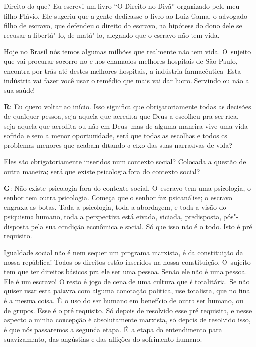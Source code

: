  

Direito do que? Eu escrevi um livro ``O Direito no Divã'' organizado
pelo meu filho Flávio. Ele sugeriu que a gente dedicasse o livro ao Luiz
Gama, o advogado filho de escravo, que defendeu o direito
do escravo, na hipótese do dono dele se recusar a libertá"-lo, de
matá"-lo, alegando que o escravo não tem vida.

 

Hoje no Brasil nós temos algumas milhões que realmente não tem vida. O~sujeito que vai procurar socorro no  e nos chamados melhores
hospitais de São Paulo, encontra por trás até destes melhores hospitais,
a indústria farmacêutica. Esta indústria vai fazer você usar o remédio
que mais vai dar lucro. Servindo ou não a sua saúde!

 

\textbf{R}: Eu quero voltar ao início. Isso significa que
obrigatoriamente todas as decisões de qualquer pessoa, seja aquela que
acredita que Deus a escolheu pra ser rica, seja aquela que acredita ou
não em Deus, mas de alguma maneira vive uma vida sofrida e sem a menor
oportunidade, será que todas as escolhas e todos os problemas menores
que acabam ditando o eixo das suas narrativas de vida?

 

Eles são obrigatoriamente inseridos num contexto social? Colocada a
questão de outra maneira; será que existe psicologia fora do contexto
social?

 

\textbf{G}: Não existe psicologia fora do contexto social. O~escravo tem
uma psicologia, o senhor tem outra psicologia. Começa que o senhor faz
psicanálise; o escravo engraxa as botas. Toda a psicologia, toda a
abordagem, e toda a visão do psiquismo humano, toda a perspectiva está
eivada, viciada, predisposta, pós"-disposta pela sua condição econômica e
social. Só que isso não é o todo. Isto é pré requisito.

 

Igualdade social não é nem sequer um programa marxista, é da
constituição da nossa república! Todos os direitos estão inseridos na
nossa constituição. O~sujeito tem que ter direitos básicos pra ele ser
uma pessoa. Senão ele não é uma pessoa. Ele é um escravo! O resto é jogo
de cena de uma cultura que é totalitária. Se não quiser usar esta
palavra com alguma conotação política, use totalista, que no final é a
mesma coisa. É~o uso do ser humano em benefício de outro ser humano, ou
de grupos. Esse é o pré requisito. Só depois de resolvido esse pré
requisito, e nesse aspecto a minha concepção é absolutamente marxista,
só depois de resolvido isso, é que nós passaremos a segunda etapa. É~a
etapa do entendimento para suavizamento, das angústias e das aflições do
sofrimento humano.

